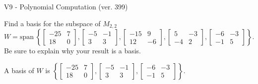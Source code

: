 \begin{exercise}
  \begin{exerciseTitle}V9 - Polynomial Computation (ver. 399)\end{exerciseTitle}
  \begin{exerciseStatement}
    Find a basis for the subspace of \(M_{2,2}\) 
\[W=\mathrm{span}\ \left\{\left[\begin{array}{cc}
-25 & 7 \\
18 & 0
\end{array}\right] , \left[\begin{array}{cc}
-5 & -1 \\
3 & 3
\end{array}\right] , \left[\begin{array}{cc}
-15 & 9 \\
12 & -6
\end{array}\right] , \left[\begin{array}{cc}
5 & -3 \\
-4 & 2
\end{array}\right] , \left[\begin{array}{cc}
-6 & -3 \\
-1 & 5
\end{array}\right]\right\}.\]
 Be sure to explain why your result is a basis.


  \end{exerciseStatement}
  \begin{exerciseAnswer}
   A basis of \(W\) is  \(\left\{\left[\begin{array}{cc}
-25 & 7 \\
18 & 0
\end{array}\right] , \left[\begin{array}{cc}
-5 & -1 \\
3 & 3
\end{array}\right] , \left[\begin{array}{cc}
-6 & -3 \\
-1 & 5
\end{array}\right]\right\}\).
  


  \end{exerciseAnswer}
\end{exercise}